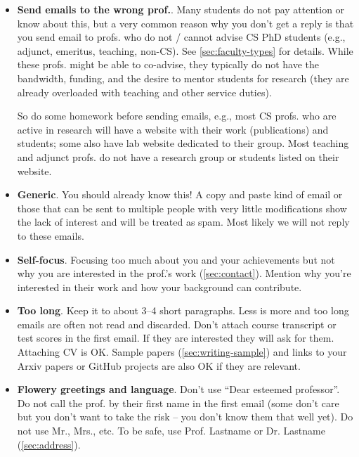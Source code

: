 \documentclass[oneside,11pt,dvipsnames]{book}
\begin{document}
\begin{itemize}
    \item \textbf{Send emails to the wrong prof.}. Many students do not pay attention or know about this, but a very common reason why you don't get a reply is that you send email to profs. who do not / cannot advise CS PhD students (e.g., adjunct, emeritus, teaching, non-CS). See \autoref{sec:faculty-types} for details. While these profs. might be able to co-advise, they typically do not have the bandwidth, funding, and the desire to mentor students for research (they are already overloaded with teaching and other service duties). 
    
    So do some homework before sending emails, e.g., most CS profs. who are active in research will have a website with their work (publications) and students; some also have lab website dedicated to their group. Most teaching and adjunct profs. do not have a research group or students listed on their website.  
        
    \item \textbf{Generic}. You should already know this! A copy and paste kind of email or those that can be sent to multiple people with very little modifications show the lack of interest and will be treated as spam. Most likely we will not reply to these emails. 

    \item \textbf{Self-focus}. Focusing too much about you and your achievements but not why you are interested in the prof.'s work (\autoref{sec:contact}). Mention why you're interested in their work and how your background can contribute. 

    \item \textbf{Too long}. Keep it to about 3--4 short paragraphs. Less is more and too long emails are often not read and discarded. Don't attach course transcript or test scores in the first email. If they are  interested they will ask for them.  Attaching CV is OK. Sample papers (\autoref{sec:writing-sample}) and links to your Arxiv papers or GitHub projects are also OK if they are relevant.
    
    \item \textbf{Flowery greetings and language}. Don't use ``Dear esteemed professor''.  Do not call the prof. by their first name in the first email (some don't care but you don't want to take the risk -- you don't know them that well yet).  Do not use Mr., Mrs., etc. To be safe, use Prof. Lastname or Dr. Lastname (\autoref{sec:address}).
    

\end{itemize}
\end{document}
